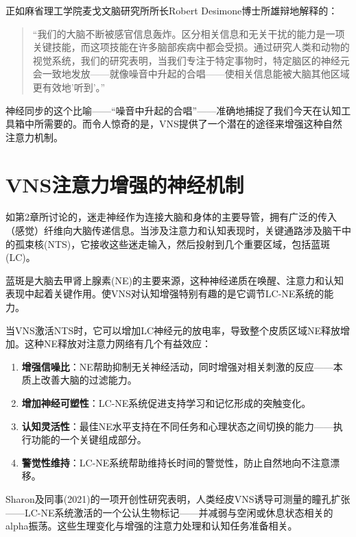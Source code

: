 \documentclass[
  Letterpaper,
]{scrbook}
\begin{document}
正如麻省理工学院麦戈文脑研究所所长Robert Desimone博士所雄辩地解释的：

\begin{quote}
``我们的大脑不断被感官信息轰炸。区分相关信息和无关干扰的能力是一项关键技能，而这项技能在许多脑部疾病中都会受损。通过研究人类和动物的视觉系统，我们的研究表明，当我们专注于特定事物时，特定脑区的神经元会一致地发放------就像噪音中升起的合唱------使相关信息能被大脑其他区域更有效地'听到'。''
\end{quote}

神经同步的这个比喻------``噪音中升起的合唱''------准确地捕捉了我们今天在认知工具箱中所需要的。而令人惊奇的是，VNS提供了一个潜在的途径来增强这种自然注意力机制。

\section{VNS注意力增强的神经机制}\label{vnsux6ce8ux610fux529bux589eux5f3aux7684ux795eux7ecfux673aux5236}

如第2章所讨论的，迷走神经作为连接大脑和身体的主要导管，拥有广泛的传入（感觉）纤维向大脑传递信息。当涉及注意力和认知表现时，关键通路涉及脑干中的孤束核(NTS)，它接收这些迷走输入，然后投射到几个重要区域，包括蓝斑(LC)。

蓝斑是大脑去甲肾上腺素(NE)的主要来源，这种神经递质在唤醒、注意力和认知表现中起着关键作用。使VNS对认知增强特别有趣的是它调节LC-NE系统的能力。

当VNS激活NTS时，它可以增加LC神经元的放电率，导致整个皮质区域NE释放增加。这种NE释放对注意力网络有几个有益效应：

\begin{enumerate}
\def\labelenumi{\arabic{enumi}.}
\item
  \textbf{增强信噪比}：NE帮助抑制无关神经活动，同时增强对相关刺激的反应------本质上改善大脑的过滤能力。
\item
  \textbf{增加神经可塑性}：LC-NE系统促进支持学习和记忆形成的突触变化。
\item
  \textbf{认知灵活性}：最佳NE水平支持在不同任务和心理状态之间切换的能力------执行功能的一个关键组成部分。
\item
  \textbf{警觉性维持}：LC-NE系统帮助维持长时间的警觉性，防止自然地向不注意漂移。
\end{enumerate}

Sharon及同事(2021)的一项开创性研究表明，人类经皮VNS诱导可测量的瞳孔扩张------LC-NE系统激活的一个公认生物标记------并减弱与空闲或休息状态相关的alpha振荡。这些生理变化与增强的注意力处理和认知任务准备相关。
\end{document}
